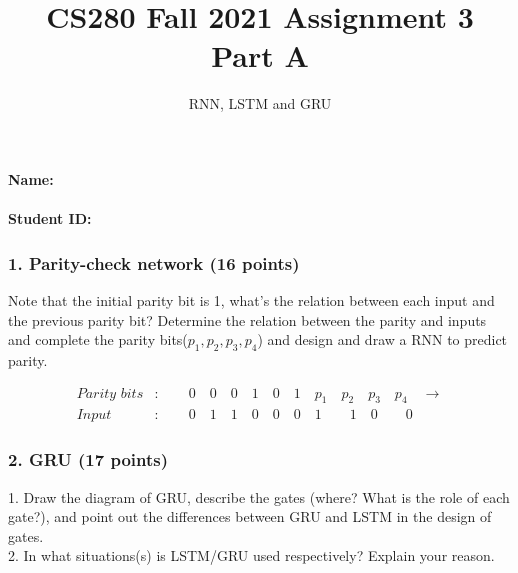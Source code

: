 \documentclass[12pt]{article}%
\begin{document}
\title{CS280 Fall 2021 Assignment 3 \\ Part A}
\author{RNN, LSTM and GRU}
\maketitle

\paragraph{Name:}

\paragraph{Student ID:}

\newpage


\subsubsection*{1. Parity-check network (16 points)}
Note that the initial parity bit is 1, what's the relation between each input and the previous parity bit? Determine the relation between the parity and inputs and complete the parity bits($p_1,p_2,p_3,p_4$) and design and draw a RNN to predict parity. 
	
	\begin{align*}
	    \textit{Parity bits}&:\quad\quad0\quad0\quad0\quad1\quad0\quad1\quad p_1\quad p_2\quad p_3 \quad p_4 \quad\rightarrow \\
	    \textit{Input}&:\quad\quad0\quad1\quad1\quad0\quad0\quad0\quad1\qquad1\quad0\qquad0
	\end{align*}



\newpage


\subsubsection*{2. GRU (17 points)}

1. Draw the diagram of GRU, describe the gates (where? What is the role of each gate?), and point out the differences between GRU and LSTM in the design of gates.\\
2. In what situations(s) is LSTM/GRU used respectively? Explain your reason.

\newpage
\end{document}
